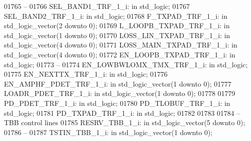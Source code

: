 \begin{DoxyCode}
01765 \textcolor{keyword}{    --}
01766     SEL\_BAND1\_TRF\_1\_i:  \textcolor{keywordflow}{in} \textcolor{comment}{std\_logic};
01767     SEL\_BAND2\_TRF\_1\_i:  \textcolor{keywordflow}{in} \textcolor{comment}{std\_logic};
01768     F\_TXPAD\_TRF\_1\_i:    \textcolor{keywordflow}{in} \textcolor{comment}{std\_logic\_vector}(\textcolor{vhdllogic}{}\textcolor{vhdllogic}{2} \textcolor{keywordflow}{downto} \textcolor{vhdllogic}{}\textcolor{vhdllogic}{0});
01769     L\_LOOPB\_TXPAD\_TRF\_1\_i:  \textcolor{keywordflow}{in} \textcolor{comment}{std\_logic\_vector}(\textcolor{vhdllogic}{}\textcolor{vhdllogic}{1} \textcolor{keywordflow}{downto} \textcolor{vhdllogic}{}\textcolor{vhdllogic}{0});
01770     LOSS\_LIN\_TXPAD\_TRF\_1\_i: \textcolor{keywordflow}{in} \textcolor{comment}{std\_logic\_vector}(\textcolor{vhdllogic}{}\textcolor{vhdllogic}{4} \textcolor{keywordflow}{downto} \textcolor{vhdllogic}{}\textcolor{vhdllogic}{0});
01771     LOSS\_MAIN\_TXPAD\_TRF\_1\_i:    \textcolor{keywordflow}{in} \textcolor{comment}{std\_logic\_vector}(\textcolor{vhdllogic}{}\textcolor{vhdllogic}{4} \textcolor{keywordflow}{downto} \textcolor{vhdllogic}{}\textcolor{vhdllogic}{0});
01772     EN\_LOOPB\_TXPAD\_TRF\_1\_i: \textcolor{keywordflow}{in} \textcolor{comment}{std\_logic};
01773 \textcolor{keyword}{    --}
01774     EN\_LOWBWLOMX\_TMX\_TRF\_1\_i:   \textcolor{keywordflow}{in} \textcolor{comment}{std\_logic};
01775     EN\_NEXTTX\_TRF\_1\_i:  \textcolor{keywordflow}{in} \textcolor{comment}{std\_logic};
01776     EN\_AMPHF\_PDET\_TRF\_1\_i:  \textcolor{keywordflow}{in} \textcolor{comment}{std\_logic\_vector}(\textcolor{vhdllogic}{}\textcolor{vhdllogic}{1} \textcolor{keywordflow}{downto} \textcolor{vhdllogic}{}\textcolor{vhdllogic}{0});
01777     LOADR\_PDET\_TRF\_1\_i: \textcolor{keywordflow}{in} \textcolor{comment}{std\_logic\_vector}(\textcolor{vhdllogic}{}\textcolor{vhdllogic}{1} \textcolor{keywordflow}{downto} \textcolor{vhdllogic}{}\textcolor{vhdllogic}{0});
01778 
01779     PD\_PDET\_TRF\_1\_i:    \textcolor{keywordflow}{in} \textcolor{comment}{std\_logic};
01780     PD\_TLOBUF\_TRF\_1\_i:  \textcolor{keywordflow}{in} \textcolor{comment}{std\_logic};
01781     PD\_TXPAD\_TRF\_1\_i:   \textcolor{keywordflow}{in} \textcolor{comment}{std\_logic};
01782 
01783 
01784 \textcolor{keyword}{    -- TBB control lines}
01785     RESRV\_TBB\_1\_i:  \textcolor{keywordflow}{in} \textcolor{comment}{std\_logic\_vector}(\textcolor{vhdllogic}{}\textcolor{vhdllogic}{5} \textcolor{keywordflow}{downto} \textcolor{vhdllogic}{}\textcolor{vhdllogic}{0});
01786 \textcolor{keyword}{    --}
01787     TSTIN\_TBB\_1\_i:  \textcolor{keywordflow}{in} \textcolor{comment}{std\_logic\_vector}(\textcolor{vhdllogic}{}\textcolor{vhdllogic}{1} \textcolor{keywordflow}{downto} \textcolor{vhdllogic}{}\textcolor{vhdllogic}{0});

\end{DoxyCode}
